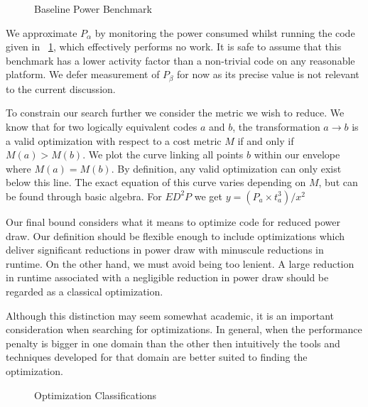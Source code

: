 \begin{figure}[ht]                                                               
\centering                                                                      
\lstset{basicstyle=\ttfamily\footnotesize\bfseries,                             
      frame=tb}                                                                 
                             
\caption{Baseline Power Benchmark}                            
\label{fig:nopjmpres}                                                           
\end{figure}  

We approximate $P_{\alpha}$ by monitoring the power consumed whilst running the code given in \figurename~\ref{fig:nopjmpres}, which effectively performs no work. It is safe to assume that this benchmark has a lower activity factor than a non-trivial code on any reasonable platform. We defer measurement of $P_{\beta}$ for now as its precise value is not relevant to the current discussion.

To constrain our search further we consider the metric we wish to reduce. We know that for two logically equivalent codes $a$ and $b$, the transformation $a \to b$ is a valid optimization with respect to a cost metric $M$ if and only if $M(a) > M(b)$. We plot the curve linking all points $b$ within our envelope where $M(a) = M(b)$. By definition, any valid optimization can only exist below this line. The exact equation of this curve varies depending on $M$, but can be found through basic algebra. For $ED^{2}P$ we get $y = (P_{a} \times t_{a}^{3}) / x^2$

Our final bound considers what it means to optimize code for reduced power draw. Our definition should be flexible enough to include optimizations which deliver significant reductions in power draw with minuscule reductions in runtime. On the other hand, we must avoid being too lenient. A large reduction in runtime associated with a negligible reduction in power draw should be regarded as a classical optimization.

Although this distinction may seem somewhat academic, it is an important consideration when searching for optimizations. In general, when the performance penalty is bigger in one domain than the other then intuitively the tools and techniques developed for that domain are better suited to finding the optimization.
\begin{figure}

\caption{Optimization Classifications}\label{fig:pow}
\end{figure}

